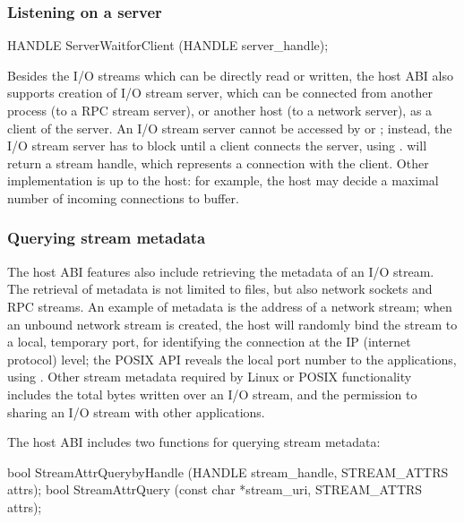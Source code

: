 \subsubsection*{Listening on a server}


\begin{paldef}
HANDLE ServerWaitforClient (HANDLE server_handle);
\end{paldef} 

Besides the I/O streams which can be directly read or written,
the host ABI also supports creation
of I/O stream server, which can be
connected from another process (to a RPC stream server), or another host (to a network server), as a client of the server.
An I/O stream server cannot be accessed by  or ;
instead, the I/O stream server has to block until a client
connects the server, using .
 will return a stream handle, which represents a connection with the client.
Other implementation
is up to the host: for example,
the host may decide a maximal number of incoming connections to buffer.









\subsubsection*{Querying stream metadata}

The host ABI features also include retrieving the metadata of an I/O stream.
The retrieval of metadata is not limited to files,
but also network sockets and RPC streams. %
An example of metadata is the address of a network stream;
when an unbound network stream is created,
the host will randomly bind the stream to a local, temporary port, for identifying the connection at the IP (internet protocol) level;
the POSIX API
reveals the local port number
to the applications,
using .
Other stream metadata required by Linux or POSIX functionality
includes the total bytes written over an I/O stream, and the permission to sharing an I/O stream with other applications.



The host ABI includes two functions for querying stream metadata:

\begin{paldef}
bool StreamAttrQuerybyHandle (HANDLE stream_handle,
                              STREAM_ATTRS attrs);
bool StreamAttrQuery (const char *stream_uri,
                      STREAM_ATTRS attrs);

\end{paldef}

